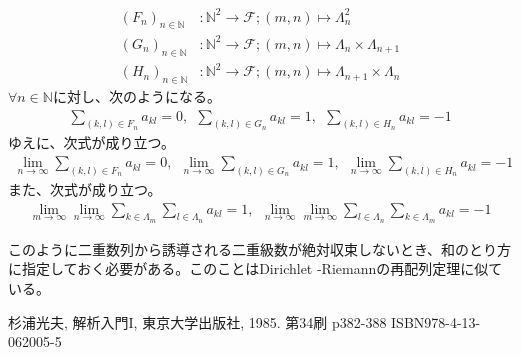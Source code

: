 \documentclass[dvipdfmx]{jsarticle}
\begin{document}
\begin{align*}
\left( F_{n} \right)_{n \in \mathbb{N}}&:\mathbb{N}^{2}\mathcal{\rightarrow F;}(m,n) \mapsto \varLambda_{n}^{2}\\
\left( G_{n} \right)_{n \in \mathbb{N}}&:\mathbb{N}^{2}\mathcal{\rightarrow F;}(m,n) \mapsto \varLambda_{n} \times \varLambda_{n + 1}\\
\left( H_{n} \right)_{n \in \mathbb{N}}&:\mathbb{N}^{2}\mathcal{\rightarrow F;}(m,n) \mapsto \varLambda_{n + 1} \times \varLambda_{n}
\end{align*}
$\forall n \in \mathbb{N}$に対し、次のようになる。
\begin{align*}
\sum_{(k,l) \in F_{n}}a_{kl} = 0,\ \ \sum_{(k,l) \in G_{n}}a_{kl} = 1,\ \ \sum_{(k,l) \in H_{n}}a_{kl} = - 1
\end{align*}
ゆえに、次式が成り立つ。
\begin{align*}
\lim_{n \rightarrow \infty}{\sum_{(k,l) \in F_{n}}a_{kl}} = 0,\ \ \lim_{n \rightarrow \infty}{\sum_{(k,l) \in G_{n}}a_{kl}} = 1,\ \ \lim_{n \rightarrow \infty}{\sum_{(k,l) \in H_{n}}a_{kl}} = - 1
\end{align*}
また、次式が成り立つ。
\begin{align*}
\lim_{m \rightarrow \infty}{\lim_{n \rightarrow \infty}{\sum_{k \in \varLambda_{m}}{\sum_{l \in \varLambda_{n}}a_{kl}}}} = 1,\ \ \lim_{n \rightarrow \infty}{\lim_{m \rightarrow \infty}{\sum_{l \in \varLambda_{n}}{\sum_{k \in \varLambda_{m}}a_{kl}}}} = - 1
\end{align*}\par
このように二重数列から誘導される二重級数が絶対収束しないとき、和のとり方に指定しておく必要がある。このことはDirichlet
-Riemannの再配列定理に似ている。
\begin{thebibliography}{50}
  杉浦光夫, 解析入門I, 東京大学出版社, 1985. 第34刷 p382-388 ISBN978-4-13-062005-5
\end{thebibliography}
\end{document}

